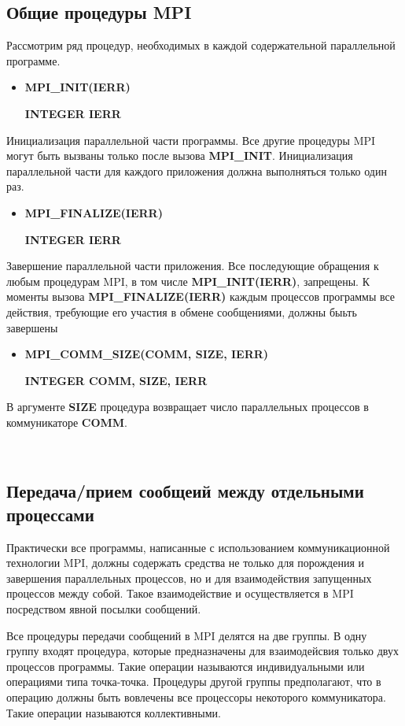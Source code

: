 \documentclass[14pt,a4paper,report]{ncc}
\begin{document}
\subsection{Общие процедуры MPI}
Рассмотрим ряд процедур, необходимых в каждой содержательной параллельной программе.
\
\begin{itemize}
\item \textbf{MPI\_INIT(IERR)}
\

\textbf{INTEGER IERR}
\
\end{itemize}
Инициализация параллельной части программы. Все другие процедуры MPI могут быть вызваны только после вызова \textbf{MPI\_INIT}. Инициализация параллельной части для каждого приложения должна выполняться только один раз.
\
\begin{itemize}
\item \textbf{MPI\_FINALIZE(IERR)}
\

\textbf{INTEGER IERR}
\
\end{itemize}
Завершение параллельной части приложения. Все последующие обращения к любым процедурам MPI, в том числе  \textbf{MPI\_INIT(IERR)}, запрещены. К моменты вызова  \textbf{MPI\_FINALIZE(IERR)} каждым процессов программы все действия, требующие его участия в обмене сообщениями, должны быьть завершены
\begin{itemize}
\item \textbf{MPI\_COMM\_SIZE(COMM, SIZE, IERR)}
\

\textbf{INTEGER COMM, SIZE,  IERR}
\
\end{itemize}
В аргументе \textbf{SIZE} процедура возвращает число параллельных процессов в коммуникаторе  \textbf{COMM}. 

\
\subsection{Передача/прием сообщеий между отдельными процессами}
Практически все программы, написанные с использованием коммуникационной технологии MPI, должны содержать средства не только для порождения и завершения параллельных процессов, но и для взаимодействия запущенных процессов между собой. Такое взаимодействие и осуществляется в MPI посредством явной посылки сообщений.
\

Все процедуры передачи сообщений в MPI делятся на две группы. В одну группу входят процедура, которые предназначены для взаимодейсвия только двух процессов программы. Такие операции называются индивидуальными или операциями типа точка-точка. Процедуры другой группы предполагают, что в операцию должны быть вовлечены все процессоры некоторого коммуникатора. Такие операции называются коллективными.
\
\end{document}
